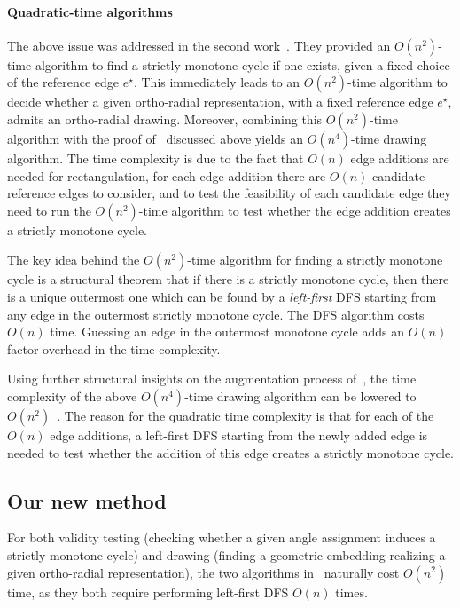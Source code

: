 \documentclass{article}\usepackage[a4paper,margin=20mm]{geometry}
\newcommand{\eref}{e^\star}
\begin{document}
\paragraph{Quadratic-time algorithms}
The above issue was addressed in the second work~\cite{niedermann19}. They provided an $O(n^2)$-time algorithm to find a strictly monotone cycle if one exists, given a fixed choice of the reference edge $\eref$. This immediately leads to an $O(n^2)$-time algorithm to decide whether a given ortho-radial representation, with a fixed reference edge $\eref$, admits an ortho-radial drawing. Moreover, combining this $O(n^2)$-time algorithm with the proof of~\cite{barth2017} discussed above yields an $O(n^4)$-time drawing algorithm. The time complexity is due to the fact that $O(n)$ edge additions are needed for rectangulation, for each edge addition there are $O(n)$ candidate reference edges to consider, and to test the feasibility of each candidate edge they need to run the  $O(n^2)$-time algorithm to test whether the edge addition creates a strictly monotone cycle.

The key idea behind the $O(n^2)$-time algorithm for finding a strictly monotone cycle is a structural theorem that if there is a strictly monotone cycle, then there is a unique outermost one which can be found by a \emph{left-first} DFS starting from any edge in the outermost strictly monotone cycle. The DFS algorithm costs $O(n)$ time. Guessing an edge in the outermost monotone cycle adds an $O(n)$ factor overhead in the time complexity.

Using further structural insights on the augmentation process of~\cite{barth2017}, the time complexity of the above $O(n^4)$-time drawing algorithm can be lowered to $O(n^2)$~\cite{niedermann19}. The reason for the quadratic time complexity is that for each of the $O(n)$ edge additions, a left-first DFS starting from the newly added edge is needed to test whether the addition of this edge creates a strictly monotone cycle. 


\subsection{Our new method}

For both validity testing (checking whether a given angle assignment induces a strictly monotone cycle) and drawing (finding a geometric embedding realizing a given ortho-radial representation), the two algorithms in~\cite{barth2023topology} naturally cost $O(n^2)$ time, as they both require performing left-first DFS  $O(n)$ times.
\end{document}
